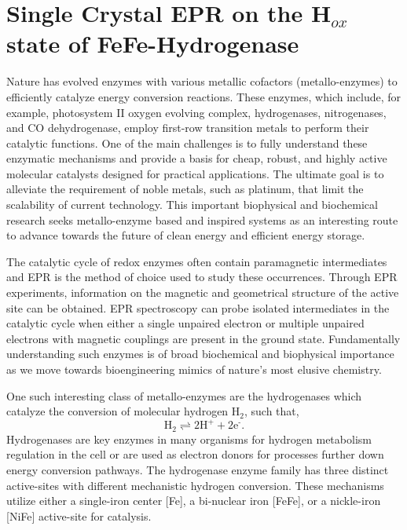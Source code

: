 \chapter[Single-Crystal EPR on FeFe-Hydrogenase Hox state]{Single Crystal EPR on the H$_{ox}$ state of FeFe-Hydrogenase}

Nature has evolved enzymes with various metallic cofactors (metallo-enzymes) to efficiently catalyze energy conversion reactions. These enzymes, which include, for example, photosystem II oxygen evolving complex\cite{CoxOEC}, hydrogenases\cite{lubitzhyd}, nitrogenases\cite{Hoffman2014rev}, and CO dehydrogenase\cite{C5CS00182J}, employ first-row transition metals to perform their catalytic functions. One of the main challenges is to fully understand these enzymatic mechanisms and provide a basis for cheap, robust, and highly active molecular catalysts designed for practical applications. \cite{Lewis15729} The ultimate goal is to alleviate the requirement of noble metals, such as platinum, that limit the scalability of current technology. This important biophysical and biochemical research seeks metallo-enzyme based and inspired systems as an interesting route to advance towards the future of clean energy and efficient energy storage. \cite{schlogl2012chemical}

The catalytic cycle of redox enzymes often contain paramagnetic intermediates and EPR is the method of choice used to study these occurrences. Through EPR experiments, information on the magnetic and geometrical structure of the active site can be obtained. EPR spectroscopy can probe isolated intermediates in the catalytic cycle when either a single unpaired electron or multiple unpaired electrons with magnetic couplings are present in the ground state. Fundamentally understanding such enzymes is of broad biochemical and biophysical importance as we move towards bioengineering mimics of nature’s most elusive chemistry. \cite{WATANABE20171}

One such interesting class of metallo-enzymes are the hydrogenases\cite{lubitzhyd} which catalyze the conversion of molecular hydrogen H$_2$, such that,
\begin{equation}
    \text{H}_2 \rightleftharpoons 2 \text{H}^+ + 2\text{e}^{\text{-}}.
\end{equation}
Hydrogenases are key enzymes in many organisms for hydrogen metabolism regulation in the cell or are used as electron donors for processes further down energy conversion pathways. The hydrogenase enzyme family has three distinct active-sites with different mechanistic hydrogen conversion. These mechanisms utilize either a single-iron center [Fe], a bi-nuclear iron [FeFe], or a nickle-iron [NiFe] active-site for catalysis.

